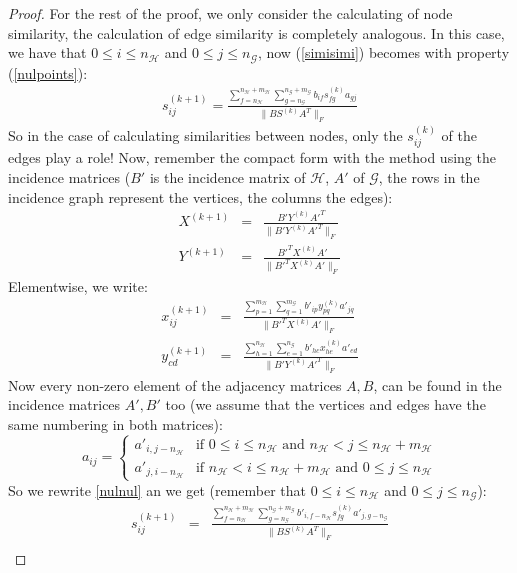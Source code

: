 \documentclass[a4paper,11pt]{report}
\newcommand{\hgraf}{\mathcal{G}}
\newcommand{\hgrafeen}{\mathcal{H}}
\begin{document}
\begin{proof}
For the rest of the proof, we only consider the calculating of node similarity, the calculation 
of edge similarity is completely analogous. In this case, we have that $0 \leq i \leq n_\hgrafeen$
 and $0 \leq j \leq n_\hgraf$, now (\ref{simisimi}) becomes with property 
 (\ref{nulpoints}):
\begin{eqnarray}s^{(k+1)}_{ij} = \frac{\sum^{n_\hgrafeen + m_\hgrafeen}_{f=n_\hgrafeen}\sum^{n_\hgraf + m_\hgraf}_{g=n_\hgraf} 
b_{if}s^{(k)}_{fg}a_{gj}}{\|BS^{(k)}A^T\|_F}\label{nulnul}\end{eqnarray}
So in the case of calculating similarities between nodes, only the $s_{ij}^{(k)}$ of 
the edges play a role! Now, remember the compact form with the method using the incidence 
matrices ($B'$ is the incidence matrix of $\hgrafeen$, $A'$ of $\hgraf$, the rows in the incidence graph
represent the vertices, the columns the edges):
 \begin{eqnarray}
   X^{(k+1)} &=& \frac{B'Y^{(k)}A'^T}{\|B'Y^{(k)}A'^T\|_F}\\
     Y^{(k+1)} &=& \frac{B'^TX^{(k)}A'}{\|B'^TX^{(k)}A'\|_F}
 \end{eqnarray}
 Elementwise, we write:
 \begin{eqnarray}
  x^{(k+1)}_{ij} &=& \frac{\sum^{m_\hgrafeen}_{p=1}\sum^{m_\hgraf}_{q=1} b'_{ip}y^{(k)}_{pq}a'_{jq}}{\|B'^TX^{(k)}A'\|_F}\label{ikmoetgelijkzijn}\\
  y^{(k+1)}_{cd} &=& \frac{\sum^{n_\hgrafeen}_{h=1}\sum^{n_\hgraf}_{e=1} b'_{hc}x^{(k)}_{he}a'_{ed}}{\|B'Y^{(k)}A'^T\|_F}
 \end{eqnarray}
 Now every non-zero element of the adjacency matrices $A, B$, can be found in the 
 incidence matrices $A', B'$ too (we assume that the vertices and edges have the same numbering in both 
 matrices):
 $$ a_{ij} = \begin{cases} a'_{i,j-n_\hgrafeen} &\text{if } 0\leq i \leq n_\hgrafeen  \text{ and } n_\hgrafeen < j \leq n_\hgrafeen + m_\hgrafeen\\ 
a'_{j,i-n_\hgrafeen} & \text{if } n_\hgrafeen < i \leq n_\hgrafeen + m_\hgrafeen \text{ and } 0 \leq j \leq n_\hgrafeen\end{cases} $$
So we rewrite \ref{nulnul} an we get (remember that $0 \leq i \leq n_\hgrafeen$
 and $0 \leq j \leq n_\hgraf$):
\begin{eqnarray}
  s^{(k+1)}_{ij} &=& \frac{\sum^{n_\hgrafeen + m_\hgrafeen}_{f=n_\hgrafeen}\sum^{n_\hgraf + m_\hgraf}_{g=n_\hgraf} 
b'_{i,f-n_\hgrafeen}s^{(k)}_{fg}a'_{j,g-n_\hgraf}}{\|BS^{(k)}A^T\|_F}\\

\end{eqnarray}
\end{proof}
\end{document}
